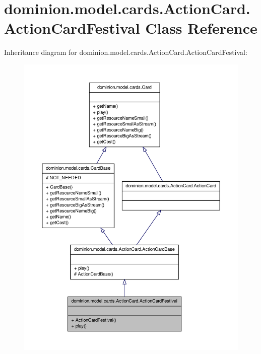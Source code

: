 \hypertarget{classdominion_1_1model_1_1cards_1_1ActionCard_1_1ActionCardFestival}{\section{dominion.\-model.\-cards.\-Action\-Card.\-Action\-Card\-Festival \-Class \-Reference}
\label{classdominion_1_1model_1_1cards_1_1ActionCard_1_1ActionCardFestival}
}


\-Inheritance diagram for dominion.\-model.\-cards.\-Action\-Card.\-Action\-Card\-Festival\-:
\nopagebreak
\begin{figure}[H]
\begin{center}
\leavevmode
\includegraphics[width=350pt]{classdominion_1_1model_1_1cards_1_1ActionCard_1_1ActionCardFestival__inherit__graph}
\end{center}
\end{figure}


